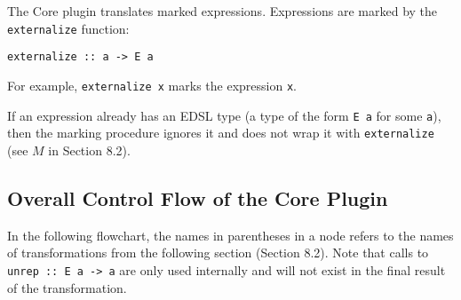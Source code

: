 \documentclass[sigplan,anonymous,review]{acmart}
\newcommand{\ttt}{\texttt}
\begin{document}
The Core plugin translates marked expressions. Expressions are marked by
the \ttt{externalize} function:

\begin{lstlisting}
externalize :: a -> E a
\end{lstlisting}

For example, \ttt{externalize x} marks the expression \ttt{x}.

If an expression already has an EDSL type (a type of the form \ttt{E a} for some
\ttt{a}), then the marking procedure ignores it and does not wrap it with
\ttt{externalize} (see $M$ in Section 8.2).

\clearpage
\subsection{Overall Control Flow of the Core Plugin}

In the following flowchart, the names in parentheses in a node refers to the names of transformations from the following section (Section 8.2). Note that
calls to \ttt{unrep :: E a -> a} are only used internally and will not exist in the final result of the transformation.
\end{document}
